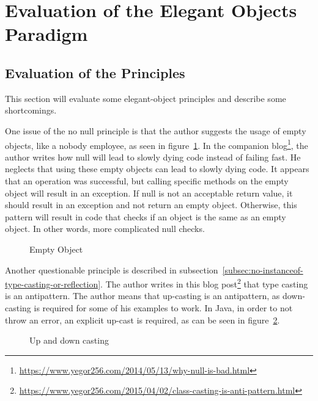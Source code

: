 \section{Evaluation of the Elegant Objects Paradigm}\label{sec:evaluation-of-the-elegant-objects-paradigm}
\subsection{Evaluation of the Principles}\label{subsec:evaluation-of-the-principles}
This section will evaluate some elegant-object principles and describe some shortcomings.

One issue of the no null principle is that the author suggests the usage of empty objects, like a nobody employee, as seen in figure\ \ref{fig:empty-object}.
In the companion blog\footnote{\url{https://www.yegor256.com/2014/05/13/why-null-is-bad.html}}, the author writes how null will lead to slowly dying code instead of failing fast.
He neglects that using these empty objects can lead to slowly dying code.
It appears that an operation was successful, but calling specific methods on the empty object will result in an exception.
If null is not an acceptable return value, it should result in an exception and not return an empty object.
Otherwise, this pattern will result in code that checks if an object is the same as an empty object.
In other words, more complicated null checks.

\begin{figure}[h]
    \caption{Empty Object}
    \label{fig:empty-object}
\end{figure}

Another questionable principle is described in subsection\ \ref{subsec:no-instanceof-type-casting-or-reflection}.
The author writes in this blog post\footnote{\url{https://www.yegor256.com/2015/04/02/class-casting-is-anti-pattern.html}} that type casting is an antipattern.
The author means that up-casting is an antipattern, as down-casting is required for some of his examples to work.
In Java, in order to not throw an error, an explicit up-cast is required, as can be seen in figure\ \ref{fig:up-and-down-casting}.

\begin{figure}[h]
    \caption{Up and down casting}
    
    \label{fig:up-and-down-casting}
\end{figure}

